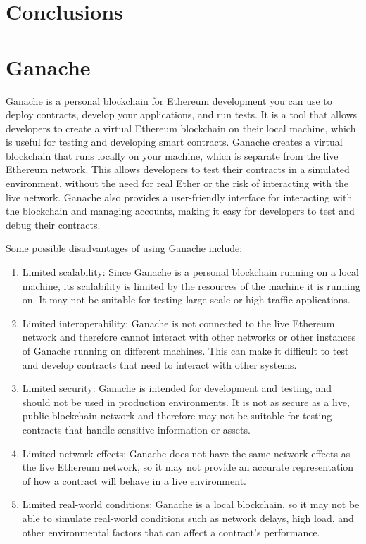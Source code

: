 \documentclass[target=mst,aauheader=]{thud}
\begin{document}
\chapter{Conclusions}

\appendix


\chapter{Ganache}
Ganache is a personal blockchain for Ethereum development you can use to deploy contracts, develop your applications, and run tests. It is a tool that allows developers to create a virtual Ethereum blockchain on their local machine, which is useful for testing and developing smart contracts. Ganache creates a virtual blockchain that runs locally on your machine, which is separate from the live Ethereum network. This allows developers to test their contracts in a simulated environment, without the need for real Ether or the risk of interacting with the live network. Ganache also provides a user-friendly interface for interacting with the blockchain and managing accounts, making it easy for developers to test and debug their contracts.\par

Some possible disadvantages of using Ganache include:

\begin{enumerate}

    \item Limited scalability: Since Ganache is a personal blockchain running on a local machine, its scalability is limited by the resources of the machine it is running on. It may not be suitable for testing large-scale or high-traffic applications.
    \item Limited interoperability: Ganache is not connected to the live Ethereum network and therefore cannot interact with other networks or other instances of Ganache running on different machines. This can make it difficult to test and develop contracts that need to interact with other systems.
    \item Limited security: Ganache is intended for development and testing, and should not be used in production environments. It is not as secure as a live, public blockchain network and therefore may not be suitable for testing contracts that handle sensitive information or assets.
    \item Limited network effects: Ganache does not have the same network effects as the live Ethereum network, so it may not provide an accurate representation of how a contract will behave in a live environment.
    \item Limited real-world conditions: Ganache is a local blockchain, so it may not be able to simulate real-world conditions such as network delays, high load, and other environmental factors that can affect a contract's performance.

\end{enumerate}
\end{document}
